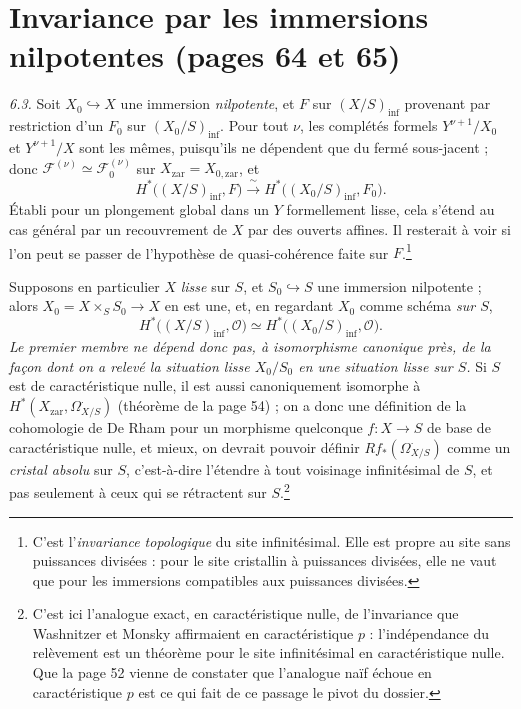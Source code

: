 \documentclass[11pt,a4paper]{article}
\begin{document}
\section*{Invariance par les immersions nilpotentes (pages 64 et 65)}

\emph{6.3.} Soit $X_0 \hookrightarrow X$ une immersion \emph{nilpotente}, et
$F$ sur $(X/S)_{\mathrm{inf}}$ provenant par restriction d'un $F_0$ sur
$(X_0/S)_{\mathrm{inf}}$. Pour tout $\nu$, les complétés formels
$Y^{\nu+1}/X_0$ et $Y^{\nu+1}/X$ sont les mêmes, puisqu'ils ne dépendent que
du fermé sous-jacent ; donc $\mathcal{F}^{(\nu)} \simeq
\mathcal{F}_0^{(\nu)}$ sur $X_{\mathrm{zar}} = X_{0,\mathrm{zar}}$, et
\[
  H^{*}\bigl((X/S)_{\mathrm{inf}}, F\bigr) \xrightarrow{\ \sim\ }
  H^{*}\bigl((X_0/S)_{\mathrm{inf}}, F_0\bigr) .
\]
Établi pour un plongement global dans un $Y$ formellement lisse, cela s'étend
au cas général par un recouvrement de $X$ par des ouverts affines. Il
resterait à voir si l'on peut se passer de l'hypothèse de quasi-cohérence
faite sur $F$.\footnote{C'est l'\emph{invariance topologique} du site
infinitésimal. Elle est propre au site sans puissances divisées : pour le
site cristallin à puissances divisées, elle ne vaut que pour les immersions
compatibles aux puissances divisées.}

Supposons en particulier $X$ \emph{lisse} sur $S$, et $S_0 \hookrightarrow
S$ une immersion nilpotente ; alors $X_0 = X \times_S S_0 \to X$ en est une,
et, en regardant $X_0$ comme schéma \emph{sur $S$},
\[
  H^{*}\bigl((X/S)_{\mathrm{inf}}, \mathcal{O}\bigr) \simeq
  H^{*}\bigl((X_0/S)_{\mathrm{inf}}, \mathcal{O}\bigr) .
\]
\emph{Le premier membre ne dépend donc pas, à isomorphisme canonique près, de
la façon dont on a relevé la situation lisse $X_0/S_0$ en une situation lisse
sur $S$.} Si $S$ est de caractéristique nulle, il est aussi canoniquement
isomorphe à $H^{*}(X_{\mathrm{zar}}, \Omega^{\cdot}_{X/S})$ (théorème de la
page 54) ; on a donc une définition de la cohomologie de De Rham pour un
morphisme quelconque $f : X \to S$ de base de caractéristique nulle, et
mieux, on devrait pouvoir définir $Rf_{*}(\Omega^{\cdot}_{X/S})$ comme un
\emph{cristal absolu} sur $S$, c'est-à-dire l'étendre à tout voisinage
infinitésimal de $S$, et pas seulement à ceux qui se rétractent sur
$S$.\footnote{C'est ici l'analogue exact, en caractéristique nulle, de
l'invariance que Washnitzer et Monsky affirmaient en caractéristique $p$ :
l'indépendance du relèvement est un théorème pour le site infinitésimal en
caractéristique nulle. Que la page 52 vienne de constater que l'analogue naïf
échoue en caractéristique $p$ est ce qui fait de ce passage le pivot du
dossier.}
\end{document}
